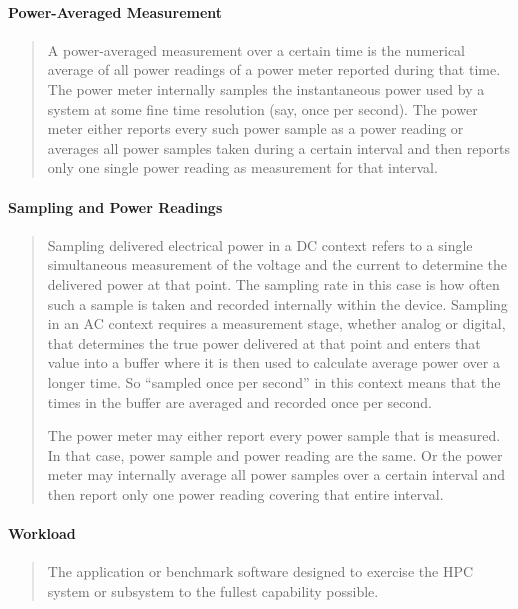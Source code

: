 \paragraph*{Power-Averaged Measurement}
\begin{quote}
A power-averaged measurement over a certain time is the numerical average of all power readings of a power meter reported during that time.
The power meter internally samples the instantaneous power used by a system at some fine time resolution (say, once per second).
The power meter either reports every such power sample as a power reading or averages all power samples taken during a certain interval and then reports only one single power reading as measurement for that interval.
\end{quote}

\paragraph*{Sampling and Power Readings}
\begin{quote}
Sampling delivered electrical power in a DC context refers to a single simultaneous measurement of the voltage and the current to determine the delivered power at that point.
The sampling rate in this case is how often such a sample is taken and recorded internally within the device.
Sampling in an AC context requires a measurement stage, whether analog or digital, that determines the true power delivered at that point and enters that value into a buffer where it is then used to calculate average power over a longer time.
So ``sampled once per second'' in this context means that the times in the buffer are averaged and recorded once per second.

The power meter may either report every power sample that is measured.
In that case, power sample and power reading are the same.
Or the power meter may internally average all power samples over a certain interval and then report only one power reading covering that entire interval.
\end{quote}

\paragraph*{Workload}
\begin{quote}
The application or benchmark software designed to exercise the HPC system or subsystem to
the fullest capability possible.
\end{quote}

